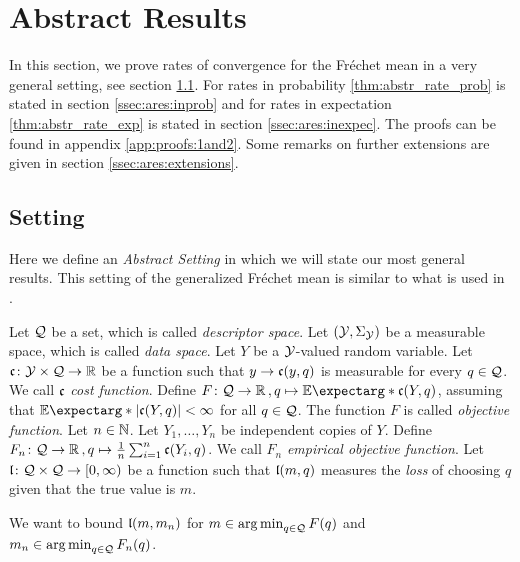 \section{Abstract Results}\label{sec:abstract_results}
%
In this section, we prove rates of convergence for the Fréchet mean in a very general setting, see section \ref{ssec:ares:generalsetting}. For rates in probability \autoref{thm:abstr_rate_prob} is stated in section \ref{ssec:ares:inprob} and for rates in expectation \autoref{thm:abstr_rate_exp} is stated in section \ref{ssec:ares:inexpec}. The proofs can be found in appendix \autoref{app:proofs:1and2}. Some remarks on further extensions are given in section \ref{ssec:ares:extensions}.
%
%
%
\subsection{Setting}\label{ssec:ares:generalsetting}
%
%
Here we define an \textit{Abstract Setting} in which we will state our most general results. This setting of the generalized Fréchet mean is similar to what is used in \cite{huckemann11, huckemann18}.

Let $\mathcal{Q}$ be a set, which is called \textit{descriptor space}. Let $(\mathcal{Y}, \Sigma_{\mathcal{Y}})$ be a measurable space, which is called \textit{data space}. Let $Y$ be a $\mathcal{Y}$-valued random variable. Let $\mathfrak{c} \colon \mathcal{Y} \times \mathcal{Q} \to \mathbb{R}$ be a function such that $y\to \mathfrak{c} (y,q)$ is measurable for every $q\in\mathcal{Q}$. We call $\mathfrak{c}$ \emph{cost function}. Define $F \colon \mc Q \to \R\eqcm q\mapsto \Ex*{\mf c(Y, q)}$, assuming that $\Ex*{\abs{\mf c(Y, q)}} < \infty$ for all $q\in\mathcal{Q}$. The function $F$ is called \textit{objective function}. 
Let $n\in\mathbb{N}$. Let $Y_1, \dots, Y_n$ be independent copies of $Y$. Define $F_n \colon \mathcal{Q} \to \mathbb{R}\, , q\mapsto \frac1n \sum_{i=1}^n \mathfrak{c}(Y_i, q)$. We call $F_n$ \textit{empirical objective function}. Let $\mathfrak{l} \colon \mathcal{Q} \times \mathcal{Q} \to [0,\infty)$ be a function such that $\mathfrak{l}(m,q)$ measures the \textit{loss} of choosing $q$ given that the true value is $m$. 

We want to bound $\mathfrak{l}(m, m_n)$ for $m\in\operatorname*{arg\,min}_{q\in\mathcal{Q}} F(q)$ and $m_n\in\operatorname*{arg\,min}_{q\in\mathcal{Q}} F_n(q)$.
%
%
%
%
